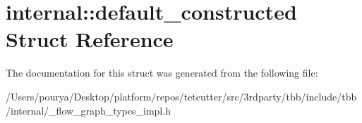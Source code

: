 \hypertarget{structinternal_1_1default__constructed}{}\section{internal\+:\+:default\+\_\+constructed Struct Reference}
\label{structinternal_1_1default__constructed}


The documentation for this struct was generated from the following file\+:\begin{DoxyCompactItemize}
\item 
/\+Users/pourya/\+Desktop/platform/repos/tetcutter/src/3rdparty/tbb/include/tbb/internal/\+\_\+flow\+\_\+graph\+\_\+types\+\_\+impl.\+h\end{DoxyCompactItemize}
